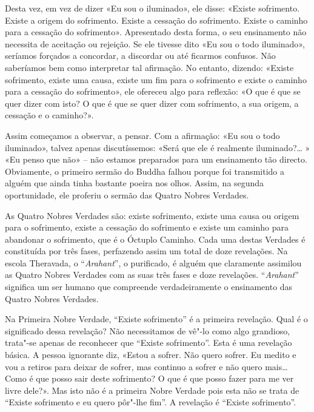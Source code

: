Desta vez, em vez de dizer «Eu sou o iluminado», ele disse: «Existe sofrimento.
Existe a origem do sofrimento. Existe a cessação do sofrimento. Existe o caminho
para a cessação do sofrimento». Apresentado desta forma, o seu ensinamento não
necessita de aceitação ou rejeição. Se ele tivesse dito «Eu sou o todo
iluminado», seríamos forçados a concordar, a discordar ou até ficarmos confusos.
Não saberíamos bem como interpretar tal afirmação. No entanto, dizendo: «Existe
sofrimento, existe uma causa, existe um fim para o sofrimento e existe o caminho
para a cessação do sofrimento», ele ofereceu algo para reflexão: «O que é que se
quer dizer com isto? O que é que se quer dizer com sofrimento, a sua origem, a
cessação e o caminho?».

\enlargethispage{\baselineskip}

Assim começamos a observar, a pensar. Com a afirmação: «Eu sou o todo
iluminado», talvez apenas discutíssemos: «Será que ele é realmente
iluminado?\ldots{} » «Eu penso que não» – não estamos preparados para um ensinamento
tão directo. Obviamente, o primeiro sermão do Buddha falhou porque foi
transmitido a alguém que ainda tinha bastante poeira nos olhos. Assim, na
segunda oportunidade, ele proferiu o sermão das Quatro Nobres Verdades.

\sectionBreak

As Quatro Nobres Verdades são: existe sofrimento, existe uma causa ou origem
para o sofrimento, existe a cessação do sofrimento e existe um caminho para
abandonar o sofrimento, que é o Óctuplo Caminho. Cada uma destas Verdades é
constituída por três fases, perfazendo assim um total de doze revelações. Na
escola Theravada, o “\emph{Arahant}”, o purificado, é alguém que claramente
assimilou as Quatro Nobres Verdades com as suas três fases e doze revelações.
“\emph{Arahant}” significa um ser humano que compreende verdadeiramente o
ensinamento das Quatro Nobres Verdades.

Na Primeira Nobre Verdade, “Existe sofrimento” é a primeira revelação. Qual é o
significado dessa revelação? Não necessitamos de vê"-lo como algo grandioso,
trata"-se apenas de reconhecer que “Existe sofrimento”. Esta é uma revelação
básica. A pessoa ignorante diz, «Estou a sofrer. Não quero sofrer. Eu medito e
vou a retiros para deixar de sofrer, mas continuo a sofrer e não quero
mais\ldots{} Como é que posso sair deste sofrimento? O que é que posso fazer
para me ver livre dele?». Mas isto não é a primeira Nobre Verdade pois esta não
se trata de “Existe sofrimento e eu quero pôr"-lhe fim”. A revelação é “Existe
sofrimento”.

